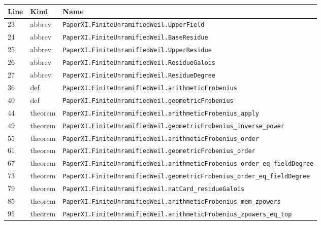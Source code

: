 \documentclass[10pt,oneside]{book}
\begin{document}
\begin{longtable}{@{}p{}p{}p{}@{}}\toprule Line&Kind&Name\\\midrule\endhead

23&abbrev&\nolinkurl{PaperXI.FiniteUnramifiedWeil.UpperField}\\

24&abbrev&\nolinkurl{PaperXI.FiniteUnramifiedWeil.BaseResidue}\\

25&abbrev&\nolinkurl{PaperXI.FiniteUnramifiedWeil.UpperResidue}\\

26&abbrev&\nolinkurl{PaperXI.FiniteUnramifiedWeil.ResidueGalois}\\

27&abbrev&\nolinkurl{PaperXI.FiniteUnramifiedWeil.ResidueDegree}\\

36&def&\nolinkurl{PaperXI.FiniteUnramifiedWeil.arithmeticFrobenius}\\

40&def&\nolinkurl{PaperXI.FiniteUnramifiedWeil.geometricFrobenius}\\

44&theorem&\nolinkurl{PaperXI.FiniteUnramifiedWeil.arithmeticFrobenius_apply}\\

49&theorem&\nolinkurl{PaperXI.FiniteUnramifiedWeil.geometricFrobenius_inverse_power}\\

55&theorem&\nolinkurl{PaperXI.FiniteUnramifiedWeil.arithmeticFrobenius_order}\\

61&theorem&\nolinkurl{PaperXI.FiniteUnramifiedWeil.geometricFrobenius_order}\\

67&theorem&\nolinkurl{PaperXI.FiniteUnramifiedWeil.arithmeticFrobenius_order_eq_fieldDegree}\\

73&theorem&\nolinkurl{PaperXI.FiniteUnramifiedWeil.geometricFrobenius_order_eq_fieldDegree}\\

79&theorem&\nolinkurl{PaperXI.FiniteUnramifiedWeil.natCard_residueGalois}\\

85&theorem&\nolinkurl{PaperXI.FiniteUnramifiedWeil.arithmeticFrobenius_mem_zpowers}\\

95&theorem&\nolinkurl{PaperXI.FiniteUnramifiedWeil.arithmeticFrobenius_zpowers_eq_top}\\


\end{longtable}
\end{document}
